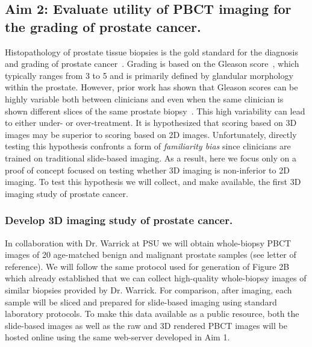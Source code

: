 \documentclass{NIHGrant}
\theoremstyle{theorem}
\begin{document}
\subsection*{Aim 2: Evaluate utility of PBCT imaging for the grading of prostate cancer.}
Histopathology of prostate tissue biopsies is the gold standard for the diagnosis and grading of prostate cancer~\cite{epstein_prostate_2018}. Grading is based on the Gleason score~\cite{epstein_prostate_2018,ozkan_interobserver_2016,flach_significant_2021}, which typically ranges from 3 to 5 and is primarily defined by glandular morphology within the prostate. However, prior work has shown that Gleason scores can be highly variable both
between clinicians and even when the same clinician is shown different slices of
the same prostate biopsy~\cite{koyuncu_visual_2023}.%
This high variability can lead to either under- or over-treatment. It is
hypothesized that scoring based on 3D images may be superior to scoring based on
2D images. Unfortunately, directly testing this hypothesis confronts a form of
\textit{familiarity bias} since clinicians are trained on traditional slide-based
imaging. As a result, here we focus only on a proof of concept focused on
testing whether 3D imaging is non-inferior to 2D imaging. To test this
hypothesis we will collect, and make available, the first 3D imaging study of
prostate cancer.

\subsubsection*{Develop 3D imaging study of prostate cancer.}
In collaboration with Dr. Warrick at PSU we will obtain whole-biopsy PBCT images of 20 age-matched benign and malignant prostate samples (see letter of reference). We will follow the same protocol used for generation of Figure 2B which already established that we can collect high-quality whole-biopsy images of similar biopsies provided by Dr. Warrick. For comparison, after imaging, each sample will be sliced and prepared for slide-based imaging using standard laboratory protocols. To make this data available as a public resource, both the slide-based images as well as the raw and 3D rendered PBCT images will be hosted online using the same web-server developed in Aim 1.
\end{document}
